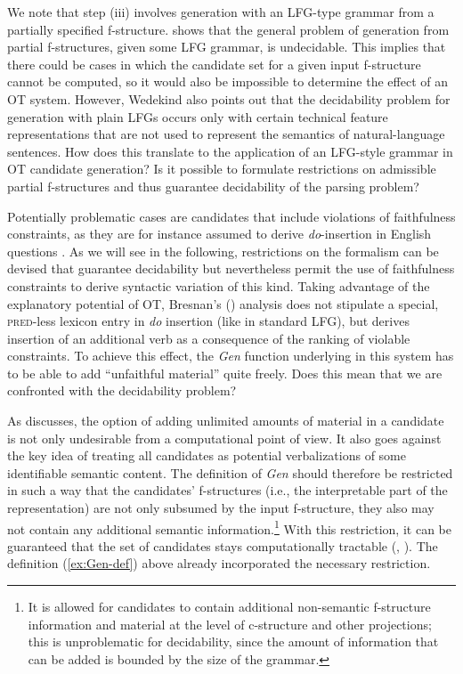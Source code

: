 \documentclass[output=paper,hidelinks]{langscibook}
\begin{document}
We note that step (iii) involves generation with an LFG-type grammar from a partially specified f-structure. \citet{Wedekind99} shows that the general problem of generation from partial f-structures, given some LFG grammar, is undecidable. This implies that there could be cases in which the candidate set for a given input f-structure cannot be computed, so it would also be impossible to determine the effect of an OT system. However, Wedekind also points out that the decidability problem for generation with plain LFGs occurs only with certain technical feature representations that are not used to represent the semantics of natural-language sentences. How does this translate to the application of an LFG-style grammar in OT candidate generation? Is it possible to formulate restrictions on admissible partial f-structures and thus guarantee decidability of the parsing problem?

Potentially problematic cases are candidates that include violations of faithfulness constraints, as they are for instance assumed to derive \emph{do}-insertion in English questions \citep[ex.~44]{bresnan00opt}.  As we will see in the following, restrictions on the formalism can be devised that guarantee decidability but nevertheless permit the use of faithfulness constraints to derive syntactic variation of this kind.
Taking advantage of the explanatory potential of OT, Bresnan's (\citeyear{bresnan00opt}) analysis does not stipulate a special, \textsc{pred}-less lexicon entry in \emph{do} insertion (like in standard LFG), but derives insertion of an additional verb as a consequence of the ranking of violable constraints.
To achieve this effect, the \emph{Gen} function underlying in this system has to be able to add ``unfaithful material'' quite freely. Does this mean that we are confronted with the decidability problem?

\newpage
As \citet[ch.~4]{Kuhn-CSLI-book} discusses, the option of adding unlimited amounts of material in a candidate is not only undesirable from a computational point of view. It also goes against the key idea of treating all candidates as potential verbalizations of some identifiable semantic content. The definition of \emph{Gen} should therefore be restricted in such a way that the candidates' f-structures (i.e., the interpretable part of the representation) are not only subsumed by the input f-structure, they also may not contain any additional semantic information.\footnote{It is allowed for candidates to contain additional non-semantic f-structure information and material at the level of c-structure and other projections; this is unproblematic for decidability, since the amount of information that can be added is bounded by the size of the grammar.} With this restriction, it can be guaranteed that the set of candidates stays computationally tractable (\citealt{kuhn-2002-ot}, \citealt[199ff]{Kuhn-CSLI-book}). The definition (\ref{ex:Gen-def}) above already incorporated the necessary restriction.
\end{document}
